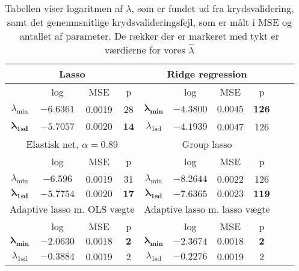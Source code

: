 \begin{table}
\center
\begin{tabular}{cccc | cccccc}
\toprule
   \multicolumn{4}{c}{Lasso} &  \multicolumn{4}{c}{Ridge regression}  \\ \midrule
 & log & MSE & p & & log & MSE & p \\
 $\lambda_{\min}$ &$-6.6361$& 0.0019 & 28 &	$\boldsymbol{\lambda_{\min}}$ &  $\mathbf{-4.3800}$ &   $\mathbf{0.0045} $&  $\mathbf{126}$ \\ 
 $\boldsymbol{\lambda}_{\textbf{1sd}}$ & $\mathbf{-5.7057}$ & $\mathbf{0.0020} $& $\mathbf{14}$ & $\lambda_{ \text{1sd}}$& $-4.1939$ & 0.0047 & 126  \\ \bottomrule \toprule
   \multicolumn{4}{c}{Elastisk net, $\alpha = 0.89$}  &  \multicolumn{4}{c}{Group lasso}  \\ \midrule
 & log & MSE & p && log & MSE & p \\
 $\lambda_{\min}$ & $-6.596$ & 0.0019 & 31 & $\lambda_{\min}$& $-8.2644$ & 0.0022  & 126 \\
  $\boldsymbol{\lambda_{\textbf{1sd}}}$ & $\mathbf{-5.7754}$ & $\mathbf{0.0020} $& $\mathbf{17}$ &   $\boldsymbol{\lambda}_{\textbf{1sd}}$  & $\mathbf{-7.6365}$ &$ \mathbf{0.0023}$ & $\mathbf{119}$ \\  \bottomrule \toprule
  \multicolumn{4}{c}{Adaptive lasso m. OLS vægte}  &  \multicolumn{4}{c}{Adaptive lasso m. lasso vægte}  \\ \midrule
  & log & MSE & p & & log & MSE & p \\
 $\boldsymbol{\lambda_{\min}}$  & $\mathbf{-2.0630}$ &$ \mathbf{0.0018}$ & $\mathbf{2}$ &  $\boldsymbol{\lambda_{\min}}$   &  $ \mathbf{-2.3674}$ & $ \mathbf{0.0018} $& $ \mathbf{2}$   \\
 $\lambda_{1\text{sd}}$ & $-0.3884$ & 0.0019 & 2 & $\lambda_{1\text{sd}}$  & $-0.2276$ & 0.0019 & 2  \\ \bottomrule
 \end{tabular}
\caption{Tabellen viser logaritmen af $\lambda$, som er  fundet ud fra krydsvalidering, samt det genenmsnitlige krydsvalideringsfejl, som er målt i MSE og antallet af parameter. De rækker der er markeret med tykt er værdierne for vores $\widehat{\lambda}$} \label{tab:cv_tab}
\end{table}
